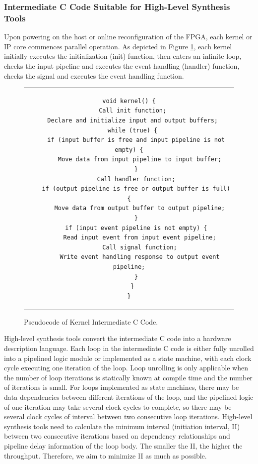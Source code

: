 \subsubsection{Intermediate C Code Suitable for High-Level Synthesis Tools}

Upon powering on the host or online reconfiguration of the FPGA, each kernel or IP core commences parallel operation. As depicted in Figure \ref{clicknp:fig:intermediate-c}, each kernel initially executes the initialization (init) function, then enters an infinite loop, checks the input pipeline and executes the event handling (handler) function, checks the signal and executes the event handling function.

\begin{figure}[htbp]
	\small
	\centering
	\begin{tabular}{c}
\begin{lstlisting}
void kernel() {
  Call init function;
  Declare and initialize input and output buffers;
  while (true) {
    if (input buffer is free and input pipeline is not empty) {
      Move data from input pipeline to input buffer;
    }
    Call handler function;
    if (output pipeline is free or output buffer is full) {
      Move data from output buffer to output pipeline;
    }
    if (input event pipeline is not empty) {
      Read input event from input event pipeline;
      Call signal function;
      Write event handling response to output event pipeline;
    }
  }
}
\end{lstlisting}
	\end{tabular}
	\caption{Pseudocode of Kernel Intermediate C Code.}
	\label{clicknp:fig:intermediate-c}
\end{figure}

High-level synthesis tools convert the intermediate C code into a hardware description language. Each loop in the intermediate C code is either fully unrolled into a pipelined logic module or implemented as a state machine, with each clock cycle executing one iteration of the loop. Loop unrolling is only applicable when the number of loop iterations is statically known at compile time and the number of iterations is small. For loops implemented as state machines, there may be data dependencies between different iterations of the loop, and the pipelined logic of one iteration may take several clock cycles to complete, so there may be several clock cycles of interval between two consecutive loop iterations. High-level synthesis tools need to calculate the minimum interval (initiation interval, II) between two consecutive iterations based on dependency relationships and pipeline delay information of the loop body. The smaller the II, the higher the throughput. Therefore, we aim to minimize II as much as possible.

